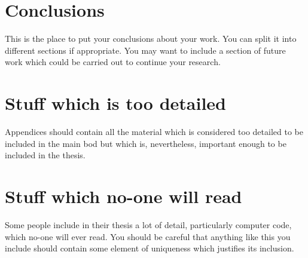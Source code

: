 \documentclass[12pt,a4paper]{report}
\begin{document}













\chapter{Conclusions}

This is the place to put your conclusions about your work. You can
split it into different sections if appropriate. You may want to include
a section of future work which could be carried out to continue your
research.

\appendix

\chapter{Stuff which is too detailed}

Appendices should contain all the material which is considered too
detailed to be included in the main bod but which is, nevertheless,
important enough to be included in the thesis.

\chapter{Stuff which no-one will read}

Some people include in their thesis a lot of detail, particularly
computer code, which no-one will ever read. You should be careful that
anything like this you include should contain some element of uniqueness
which justifies its inclusion.



\end{document}
